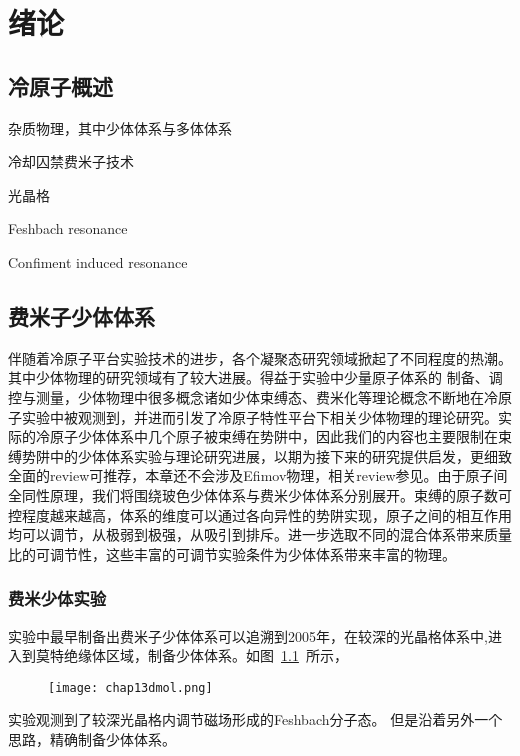 \chapter{绪论}\label{chap:kondo}

\section{冷原子概述}

杂质物理，其中少体体系与多体体系


冷却囚禁费米子技术

光晶格

Feshbach resonance

Confiment induced resonance

\section{费米子少体体系}\label{sec:fewbody}
伴随着冷原子平台实验技术的进步，各个凝聚态研究领域掀起了不同程度的热潮。其中少体物理的研究领域有了较大进展。得益于实验中少量原子体系的
制备、调控与测量，少体物理中很多概念诸如少体束缚态、费米化等理论概念不断地在冷原子实验中被观测到，并进而引发了冷原子特性平台下相关少体物理的理论研究。实际的冷原子少体体系中几个原子被束缚在势阱中，因此我们的内容也主要限制在束缚势阱中的少体体系实验与理论研究进展，以期为接下来的研究提供启发，更细致全面的review可推荐\cite{sowinski2019one,blume2012few}，本章还不会涉及Efimov物理，相关review参见\cite{nielsen2001three,braaten2006universality,KohlerMolFRRMP}。由于原子间全同性原理，我们将围绕玻色少体体系与费米少体体系分别展开。束缚的原子数可控程度越来越高，体系的维度可以通过各向异性的势阱实现，原子之间的相互作用均可以调节，从极弱到极强，从吸引到排斥。进一步选取不同的混合体系带来质量比的可调节性，这些丰富的可调节实验条件为少体体系带来丰富的物理。

\subsection{费米少体实验}
实验中最早制备出费米子少体体系可以追溯到2005年，在较深的光晶格体系中,进入到莫特绝缘体区域，制备少体体系\cite{greiner2002quantum,EsslingerFermiSea,Esslinger1DMol,Esslinger3DMol,Ospelkaus3DMol,Hecker3DMol,SalaCIRMol}。如图~\ref{3dmol}~所示，
\begin{figure}[!htbp]
    \centering
    \texttt{[image: chap13dmol.png]}
    \label{3dmol}
\end{figure}
实验观测到了较深光晶格内调节磁场形成的Feshbach分子态。
但是沿着另外一个思路，精确制备少体体系\cite{SerwaneDeterministic,zurn2012fermionization,WenzFermiSeaOnebyOne,Zurn2013Pairing,MurmannSpinChain,MurmannTwoFermionDoubleWell,RontaniTunneling}。

